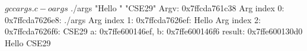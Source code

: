\documentclass[12pt, oneside, landscape]{article}
\begin{document}
  \begin{minipage}{0.45\textwidth}
  
\begin{shell}[linewidth=10cm]
$ gcc args.c -o args
$ ./args "Hello " "CSE29"
Argv: 0x7ffcda761c38
Arg index 0: 0x7ffcda7626e8: ./args
Arg index 1: 0x7ffcda7626ef: Hello
Arg index 2: 0x7ffcda7626f6: CSE29
a: 0x7ffe600146ef, b: 0x7ffe600146f6
result: 0x7ffe600130d0
Hello CSE29
\end{shell}
  \end{minipage}
  \newpage

  \begin{minipage}{0.45\textwidth}
  
  \end{minipage}
\end{document}
